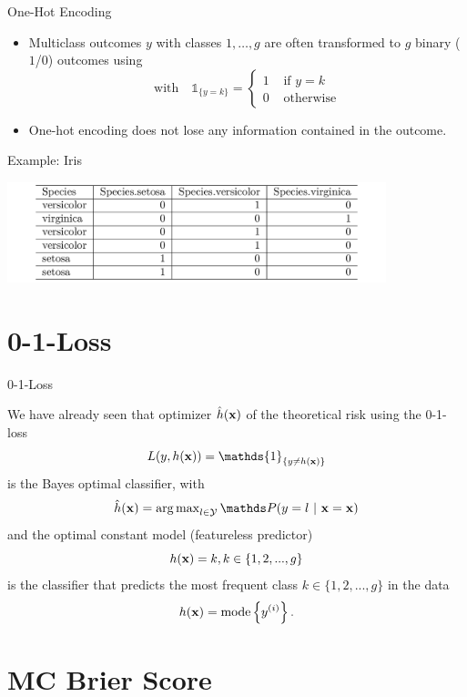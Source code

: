 \documentclass[11pt,compress,t,notes=noshow, xcolor=table]{beamer}
\begin{document}
\begin{vbframe}{One-Hot Encoding}
\begin{itemize}
\item Multiclass outcomes $y$ with classes $1,\dots, g$ are often transformed to $g$ binary ($1$/$0$) outcomes 
using 
$$
\text{with}\quad \mathds{1}_{\{y = k\}} = \begin{cases} 1 & \text{ if } y = k \\
0 & \text{ otherwise}\end{cases}
$$
\item One-hot encoding does not lose any information contained in the outcome. 
\end{itemize}
\vspace{0.2cm}
Example: Iris

\vspace*{0.1cm}
\begin{center}
\includegraphics[width = 11cm ]{figure/iris_encoding.png}
\end{center}

\end{vbframe}

\section{0-1-Loss}

\begin{vbframe}{0-1-Loss}

We have already seen that optimizer $\hat{h}(\mathbf{x})$ of the theoretical risk using the 0-1-loss 
$$ 
L(y, \hx) = \mathds{1}_{\{y \neq \hx\}} 
$$
is the Bayes optimal classifier, with
$$ 
\hxh = \argmax_{l \in \Yspace} \P(y = l~|~ \xv = \xv)
$$
and the optimal constant model (featureless predictor) 
$$
h(\mathbf{x}) = k, k \in \{1, 2, ..., g\} 
$$
is the classifier that predicts the most frequent class $k \in \{1, 2, ..., g\}$ in the data
$$
h(\mathbf{x}) = \text{mode} \left\{y^{(i)}\right\}.
$$
\framebreak



\end{vbframe}



\section{MC Brier Score}
\end{document}
